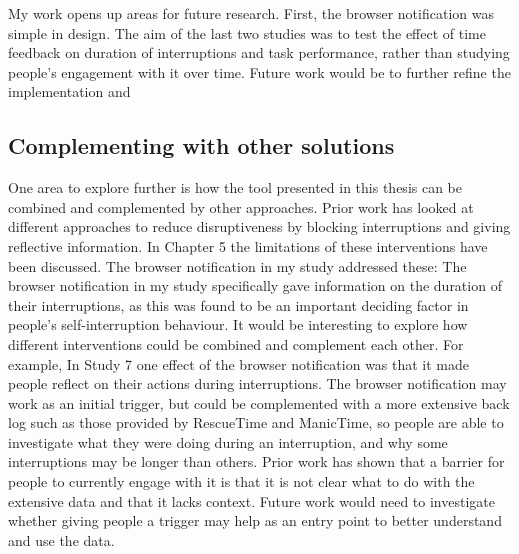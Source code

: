 My work opens up areas for future research. First, the browser notification was simple in design. The aim of the last two studies was to test the effect of time feedback on duration of interruptions and task performance, rather than studying people’s engagement with it over time. Future work would be to further refine the implementation and 

\subsection{Complementing with other solutions}
One area to explore further is how the tool presented in this thesis can be combined and complemented by other approaches. Prior work has looked at different approaches to reduce disruptiveness by blocking interruptions and giving reflective information. In Chapter 5 the limitations of these interventions have been discussed. The browser notification in my study addressed these: The browser notification in my study specifically gave information on the duration of their interruptions, as this was found to be an important deciding factor in people’s self-interruption behaviour. It would be interesting to explore how different interventions could be combined and complement each other. For example, In Study 7 one effect of the browser notification was that it made people reflect on their actions during interruptions. The browser notification may work as an initial trigger, but could be complemented with a more extensive back log such as those provided by RescueTime and ManicTime, so people are able to investigate what they were doing during an interruption, and why some interruptions may be longer than others. Prior work has shown that a barrier for people to currently engage with it is that it is not clear what to do with the extensive data and that it lacks context. Future work would need to investigate whether giving people a trigger may help as an entry point to better understand and use the data. 

